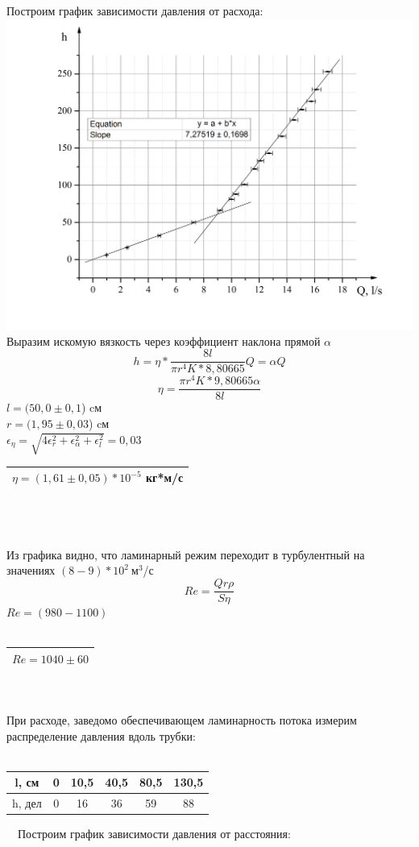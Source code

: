 \documentclass[11pt]{article}
\begin{document}
Построим график зависимости давления от расхода:\\
\includegraphics[scale=0.7]{Graph1.jpg}
Выразим искомую вязкость через коэффициент наклона прямой $\alpha$
$$h=\eta*\frac{8l}{\pi r^4K*8,80665}Q=\alpha Q$$
$$\eta = \frac{\pi r^4 K*9,80665 \alpha}{8l}$$
$l=(50,0\pm0,1$) cм \\
$r=(1,95\pm0,03$) cм \\
$\epsilon_\eta = \sqrt{4\epsilon_r^2+\epsilon_\alpha^2+\epsilon_l^2}=0,03$\\
\begin{tabular}{|c|}
\hline 
$\eta =(1,61\pm0,05)*10^{-5}$ кг*м/с \\ 
\hline 
\end{tabular} 
\ \\
\ \\
\ \\
Из графика видно, что ламинарный режим переходит в турбулентный на значениях $(8-9)*10^2 \ $м$^3$/с
$$Re=\frac{Qr\rho}{S\eta}$$
$Re=(980-1100)$
\ \\
\ \\
\begin{tabular}{|c|}
\hline 
$Re=1040\pm60$\\ 
\hline 
\end{tabular}
\ \\
\ \\
При расходе, заведомо обеспечивающем ламинарность потока измерим распределение давления вдоль трубки:\\
\ \\
\begin{tabular}{|c|c|c|c|c|c|}
\hline 
l, см & 0 & 10,5 & 40,5 & 80,5 & 130,5 \\ 
\hline 
h, дел & 0 & 16 & 36 & 59 & 88 \\ 
\hline 
\end{tabular} \ \ Построим график зависимости давления от расстояния: \\
\end{document}
